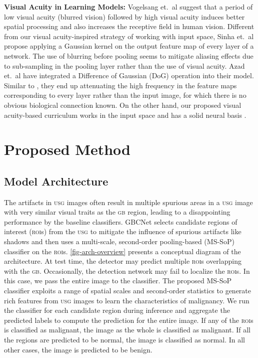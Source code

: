 \documentclass[10pt,twocolumn,letterpaper]{article}
\def\etal{{et.~al}}
\def\usg{\textsc{usg}\xspace}
\def\gb{\textsc{gb}\xspace}
\def\rois{\textsc{roi}s\xspace}
\newcommand{\myfirstpara}[1]{\noindent \textbf{#1:}}
\newcommand{\mypara}[1]{\vspace{0.1em} \myfirstpara{#1}}
\begin{document}
\mypara{Visual Acuity in Learning Models}
Vogelsang \etal \cite{vogelsang2018VisualAcuity} suggest that a period of low visual acuity (blurred vision) followed by high visual acuity induces better spatial processing and also increases the receptive field in human vision. 
Different from our visual acuity-inspired strategy of working with input space, Sinha \etal \cite{sinha2020curriculumBySmoothing} propose applying a Gaussian kernel on the output feature map of every layer of a network. The use of blurring before pooling seems to mitigate aliasing effects due to sub-sampling in the pooling layer rather than the use of visual acuity. Azad \etal \cite{azad2020textureDoG} have integrated a Difference of Gaussian (DoG) operation into their model. Similar to \cite{sinha2020curriculumBySmoothing}, they end up attenuating the high frequency in the feature maps corresponding to every layer rather than the input image, for which there is no obvious biological connection known. On the other hand, our proposed visual acuity-based curriculum works in the input space and has a solid neural basis \cite{vogelsang2018VisualAcuity}.
 
\section{Proposed Method}
\subsection{Model Architecture}
The artifacts in \usg images often result in multiple spurious areas in a \usg image with very similar visual traits as the \gb region, leading to a disappointing performance by the baseline classifiers. 
GBCNet selects candidate regions of interest (\rois) from the \usg to mitigate the influence of spurious artifacts like shadows and then uses a multi-scale, second-order pooling-based (MS-SoP) classifier on the \rois. \cref{fig-arch-overview} presents a conceptual diagram of the architecture. 
At test time, the detector may predict multiple \rois overlapping with the \gb. Occasionally, the detection network may fail to localize the \rois. In this case, we pass the entire image to the classifier. The proposed MS-SoP classifier exploits a range of spatial scales 
and second-order statistics to generate rich features from \usg images to learn the characteristics of malignancy. We run the classifier for each candidate region during inference and aggregate the predicted labels to compute the prediction for the entire image. If any of the \rois is classified as malignant, the image as the whole is classified as malignant. If all the regions are predicted to be normal, the image is classified as normal. In all other cases, the image is predicted to be benign. 
\end{document}
